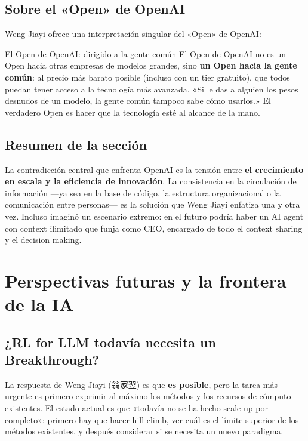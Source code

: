 \documentclass[a4paper]{article}
\begin{document}
\subsection{Sobre el «Open» de OpenAI}

Weng Jiayi ofrece una interpretación singular del «Open» de OpenAI:

\begin{importantbox}{El Open de OpenAI: dirigido a la gente común}
El Open de OpenAI no es un Open hacia otras empresas de modelos grandes, sino \textbf{un Open hacia la gente común}: al precio más barato posible (incluso con un tier gratuito), que todos puedan tener acceso a la tecnología más avanzada. «Si le das a alguien los pesos desnudos de un modelo, la gente común tampoco sabe cómo usarlos.» El verdadero Open es hacer que la tecnología esté al alcance de la mano.
\end{importantbox}

\subsection{Resumen de la sección}

La contradicción central que enfrenta OpenAI es la tensión entre \textbf{el crecimiento en escala y la eficiencia de innovación}. La consistencia en la circulación de información —ya sea en la base de código, la estructura organizacional o la comunicación entre personas— es la solución que Weng Jiayi enfatiza una y otra vez. Incluso imaginó un escenario extremo: en el futuro podría haber un AI agent con context ilimitado que funja como CEO, encargado de todo el context sharing y el decision making.

\section{Perspectivas futuras y la frontera de la IA}

\subsection{¿RL for LLM todavía necesita un Breakthrough?}

La respuesta de Weng Jiayi (翁家翌) es que \textbf{es posible}, pero la tarea más urgente es primero exprimir al máximo los métodos y los recursos de cómputo existentes. El estado actual es que «todavía no se ha hecho scale up por completo»: primero hay que hacer hill climb, ver cuál es el límite superior de los métodos existentes, y después considerar si se necesita un nuevo paradigma.
\end{document}
